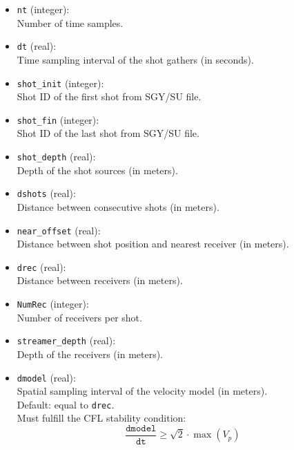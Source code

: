 \documentclass[11pt, oneside]{article}   	%
\begin{document}
\begin{itemize}
\item \texttt{nt} (integer):\\
Number of time samples.\\

\item \texttt{dt} (real):\\
Time sampling interval of the shot gathers (in seconds).\\

\item \texttt{shot\_init} (integer):\\
Shot ID of the first shot from SGY/SU file.\\

\item \texttt{shot\_fin} (integer):\\
Shot ID of the last shot from SGY/SU file.\\

\item \texttt{shot\_depth} (real):\\
Depth of the shot sources (in meters).\\

\item \texttt{dshots} (real):\\
Distance between consecutive shots (in meters). \\

\item \texttt{near\_offset} (real):\\
Distance between shot position and nearest receiver (in meters).\\

\item \texttt{drec} (real):\\
Distance between receivers (in meters).\\

\item \texttt{NumRec} (integer):\\
Number of receivers per shot.\\

\item \texttt{streamer\_depth} (real):\\
Depth of the receivers (in meters).\\

\item \texttt{dmodel} (real):\\
Spatial sampling interval of the velocity model (in meters).\\
Default: equal to \texttt{drec}.\\
Must fulfill the CFL stability condition: 
\[
\frac{\texttt{dmodel}}{\texttt{dt}} \geq \sqrt{2} \cdot \max(V_p)
\]


\end{itemize}
\end{document}
